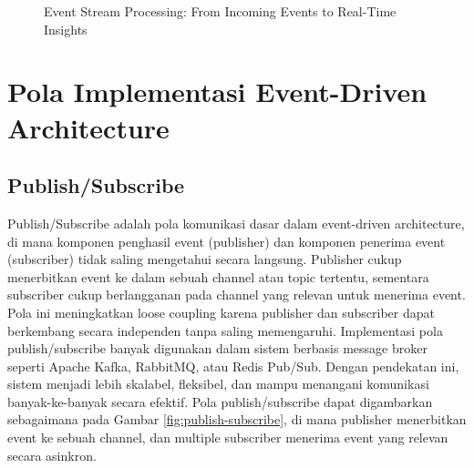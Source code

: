 \begin{figure}[h]
	\centering
	\caption{Event Stream Processing: From Incoming Events to Real-Time Insights}
	\label{fig:event-stream-processing}
\end{figure}


\section{Pola Implementasi Event-Driven Architecture}

\subsection{Publish/Subscribe}
Publish/Subscribe adalah pola komunikasi dasar dalam event-driven architecture, di mana komponen penghasil event (publisher) dan komponen penerima event (subscriber) tidak saling mengetahui secara langsung. Publisher cukup menerbitkan event ke dalam sebuah channel atau topic tertentu, sementara subscriber cukup berlangganan pada channel yang relevan untuk menerima event. Pola ini meningkatkan loose coupling karena publisher dan subscriber dapat berkembang secara independen tanpa saling memengaruhi. Implementasi pola publish/subscribe banyak digunakan dalam sistem berbasis message broker seperti Apache Kafka, RabbitMQ, atau Redis Pub/Sub. Dengan pendekatan ini, sistem menjadi lebih skalabel, fleksibel, dan mampu menangani komunikasi banyak-ke-banyak secara efektif. Pola publish/subscribe dapat digambarkan sebagaimana pada Gambar \ref{fig:publish-subscribe}, di mana publisher menerbitkan event ke sebuah channel, dan multiple subscriber menerima event yang relevan secara asinkron.

